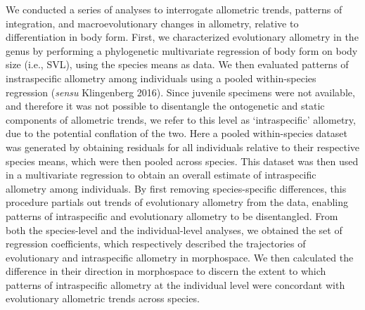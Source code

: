\documentclass[
  11pt,
]{article}
\begin{document}
We conducted a series of analyses to interrogate allometric trends,
patterns of integration, and macroevolutionary changes in allometry,
relative to differentiation in body form. First, we characterized
evolutionary allometry in the genus by performing a phylogenetic
multivariate regression of body form on body size (i.e., SVL), using the
species means as data. We then evaluated patterns of instraspecific
allometry among individuals using a pooled within-species regression
(\emph{sensu} Klingenberg 2016). Since juvenile specimens were not
available, and therefore it was not possible to disentangle the
ontogenetic and static components of allometric trends, we refer to this
level as `intraspecific' allometry, due to the potential conflation of
the two. Here a pooled within-species dataset was generated by obtaining
residuals for all individuals relative to their respective species
means, which were then pooled across species. This dataset was then used
in a multivariate regression to obtain an overall estimate of
intraspecific allometry among individuals. By first removing
species-specific differences, this procedure partials out trends of
evolutionary allometry from the data, enabling patterns of intraspecific
and evolutionary allometry to be disentangled. From both the
species-level and the individual-level analyses, we obtained the set of
regression coefficients, which respectively described the trajectories
of evolutionary and intraspecific allometry in morphospace. We then
calculated the difference in their direction in morphospace to discern
the extent to which patterns of intraspecific allometry at the
individual level were concordant with evolutionary allometric trends
across species. \hfill\break
\end{document}
